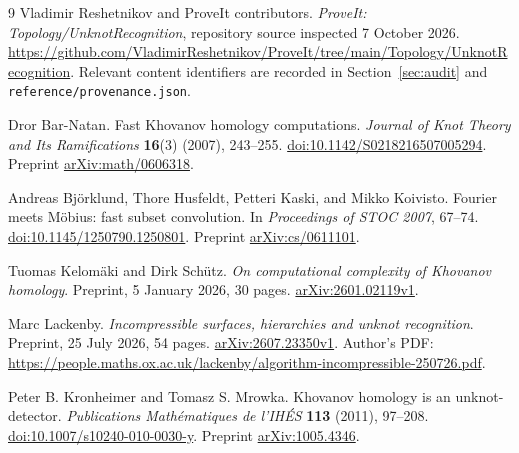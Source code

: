 \documentclass[11pt]{article}
\theoremstyle{definition}\newtheorem{definition}[theorem]{Definition}
\theoremstyle{remark}\newtheorem{remark}[theorem]{Remark}
\newcommand{\code}[1]{\texttt{#1}}
\begin{document}
\begingroup
\small
\setlength{\parskip}{0pt}
\raggedright
\begin{thebibliography}{9}
\setlength{\itemsep}{4pt}
Vladimir Reshetnikov and ProveIt contributors.
\emph{ProveIt: Topology/UnknotRecognition}, repository source inspected 7 October 2026.
\url{https://github.com/VladimirReshetnikov/ProveIt/tree/main/Topology/UnknotRecognition}.
Relevant content identifiers are recorded in Section~\ref{sec:audit} and \code{reference/provenance.json}.

Dror Bar-Natan.
Fast Khovanov homology computations.
\emph{Journal of Knot Theory and Its Ramifications} \textbf{16}(3) (2007), 243--255.
\href{https://doi.org/10.1142/S0218216507005294}{doi:10.1142/S0218216507005294}.
Preprint \href{https://arxiv.org/abs/math/0606318}{arXiv:math/0606318}.

Andreas Bj\"orklund, Thore Husfeldt, Petteri Kaski, and Mikko Koivisto.
Fourier meets M\"obius: fast subset convolution.
In \emph{Proceedings of STOC 2007}, 67--74.
\href{https://doi.org/10.1145/1250790.1250801}{doi:10.1145/1250790.1250801}.
Preprint \href{https://arxiv.org/abs/cs/0611101}{arXiv:cs/0611101}.

Tuomas Kelom\"aki and Dirk Sch\"utz.
\emph{On computational complexity of Khovanov homology}.
Preprint, 5 January 2026, 30 pages.
\href{https://arxiv.org/abs/2601.02119v1}{arXiv:2601.02119v1}.

Marc Lackenby.
\emph{Incompressible surfaces, hierarchies and unknot recognition}.
Preprint, 25 July 2026, 54 pages.
\href{https://arxiv.org/abs/2607.23350v1}{arXiv:2607.23350v1}.
Author's PDF: \url{https://people.maths.ox.ac.uk/lackenby/algorithm-incompressible-250726.pdf}.

Peter B. Kronheimer and Tomasz S. Mrowka.
Khovanov homology is an unknot-detector.
\emph{Publications Math\'ematiques de l'IH\'ES} \textbf{113} (2011), 97--208.
\href{https://doi.org/10.1007/s10240-010-0030-y}{doi:10.1007/s10240-010-0030-y}.
Preprint \href{https://arxiv.org/abs/1005.4346}{arXiv:1005.4346}.
\end{thebibliography}
\endgroup
\end{document}
